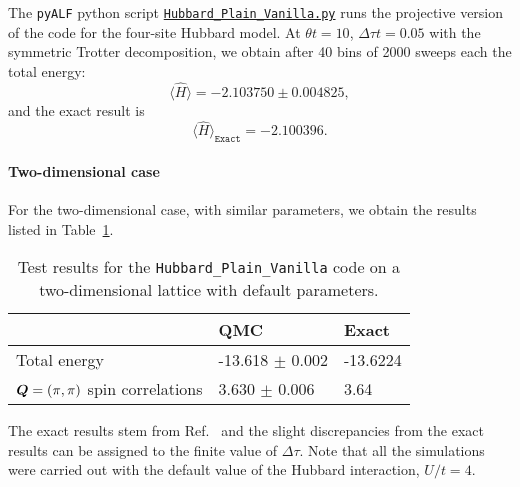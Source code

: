 The \texttt{pyALF} python script   \href{https://git.physik.uni-wuerzburg.de/ALF/pyALF/-/blob/master/Scripts/Hubbard_Plain_Vanilla.py}{\texttt{Hubbard\_Plain\_Vanilla.py}}   runs the projective version of the code for the four-site Hubbard model.  At $\theta t =10$, $\Delta \tau t = 0.05 $ with the symmetric Trotter  decomposition, we obtain after 40 bins of 2000 sweeps each the total energy:   
\begin{equation*}
       \langle  \hat{H}   \rangle = -2.103750  \pm      0.004825,
 \end{equation*}
and the exact result is  
\begin{equation*}
\langle  \hat{H}   \rangle_{\texttt{Exact}}    = -2.100396.
\end{equation*}

\paragraph*{Two-dimensional case}  
For the two-dimensional case,   with similar parameters, we obtain the results listed in Table~\ref{tab:2dplain}.
\begin{table}[h!]
\begin{center}
\begin{tabular}{l l l}
\toprule
             &  QMC  & Exact  \\ \midrule
Total energy & -13.618   $\pm $  0.002 &  -13.6224  \\
 $\boldsymbol{Q}=(\pi,\pi)$ spin correlations &  \phantom{-1}3.630     $ \pm $   0.006     & \phantom{-1}3.64 \\ 
 \bottomrule
\end{tabular}
\caption{Test results for the \texttt{Hubbard\_Plain\_Vanilla} code on a two-dimensional lattice with default parameters.} \label{tab:2dplain}
\end{center}
\end{table}
The exact results stem from Ref.~\cite{Parola91}     and the slight discrepancies from the exact results can be  assigned to the finite value of $\Delta \tau$.  Note that all the simulations were carried out with the default value of the Hubbard interaction, $U/t =4$. 
